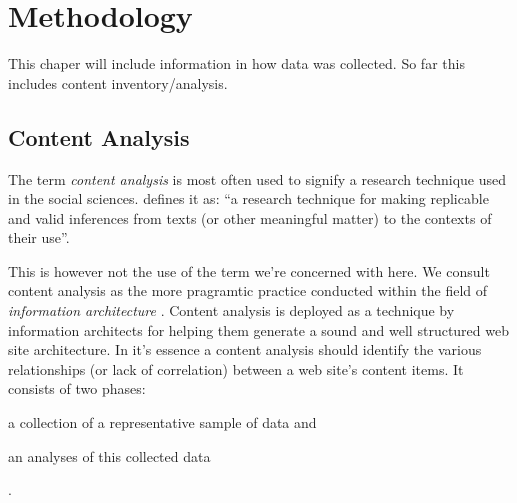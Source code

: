 \chapter{Methodology}
\label{chapter:methodology}

This chaper will include information in how data was collected. So far this
includes content inventory/analysis.

\section{Content Analysis}

The term \emph{content analysis} is most often used to signify a research
technique used in the social sciences.
\citet[p.~18]{krippendorff03} defines it as:
``a research technique for making replicable and valid
inferences from texts (or other meaningful matter) to the contexts of their
use''.

This is however not the use of the term we're concerned with here. We consult
content analysis as the more pragramtic practice conducted within the field of
\emph{information architecture}%
.
Content analysis is deployed as a technique by information architects for
helping them generate a sound and well structured web site architecture.
In it's essence a content analysis should identify the various
relationships (or lack of correlation) between a web site's content items.
It consists of two phases:
\begin{inparaenum}[(i)]
  \item a collection of a representative sample of data and
  \item an analyses of this collected data
\end{inparaenum}
\citep[pp.~241--243]{morville06}.

